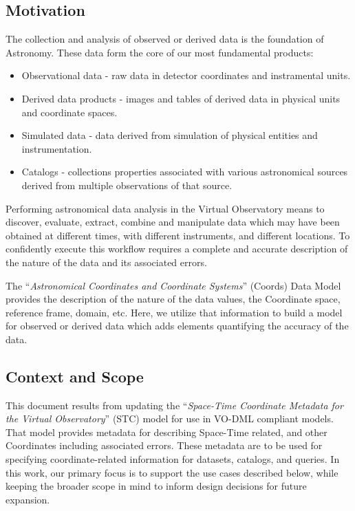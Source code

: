 \documentclass[11pt,a4paper]{ivoa}
\begin{document}
\subsection{Motivation}
The collection and analysis of observed or derived data is the foundation of Astronomy.  
These data form the core of our most fundamental products:
\begin{itemize}
  \item Observational data - raw data in detector coordinates and instramental units.
  \item Derived data products - images and tables of derived data in physical units and coordinate spaces.
  \item Simulated data - data derived from simulation of physical entities and instrumentation.
  \item Catalogs - collections properties associated with various astronomical sources derived from multiple observations of that source.
\end{itemize}

Performing astronomical data analysis in the Virtual Observatory means to discover, evaluate, 
extract, combine and manipulate data which may have been obtained at different times, 
with different instruments, and different locations.  To confidently execute this workflow 
requires a complete and accurate description of the nature of the data and its associated errors.  

The ``\emph{Astronomical Coordinates and Coordinate Systems}'' (Coords) \citep{std:Coords} Data Model provides the description of the nature of the data values, the Coordinate space, reference frame, domain, etc.  Here, we utilize that information to build a model for observed or derived data which adds elements quantifying the accuracy of the data.

\subsection{Context and Scope}

This document results from updating the ``\emph{Space-Time Coordinate Metadata for the Virtual Observatory}'' (STC) \citep{std:STC} model for use in VO-DML compliant models.  That model provides metadata for describing Space-Time related, and other Coordinates including associated errors.  These metadata are to be used for specifying coordinate-related information for datasets, catalogs, and queries.  In this work, our primary focus is to support the use cases described below, while keeping the broader scope in mind to inform design decisions for future expansion.
\end{document}
